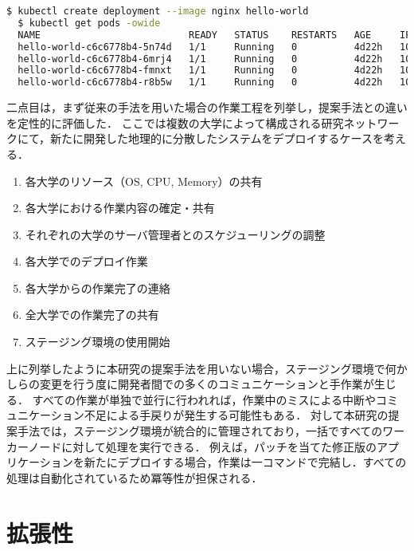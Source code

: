 \begin{lstlisting}[language=bash]
  $ kubectl create deployment --image nginx hello-world
  $ kubectl get pods -owide
  NAME                          READY   STATUS    RESTARTS   AGE     IP          NODE       NOMINATED NODE   READINESS GATES
  hello-world-c6c6778b4-5n74d   1/1     Running   0          4d22h   10.44.0.1   node01     <none>           <none>
  hello-world-c6c6778b4-6mrj4   1/1     Running   0          4d22h   10.42.0.1   node03     <none>           <none>
  hello-world-c6c6778b4-fmnxt   1/1     Running   0          4d22h   10.47.0.1   node02     <none>           <none>
  hello-world-c6c6778b4-r8b5w   1/1     Running   0          4d22h   10.44.0.2   node04   <none>           <none>
\end{lstlisting}

二点目は，まず従来の手法を用いた場合の作業工程を列挙し，提案手法との違いを定性的に評価した．
ここでは複数の大学によって構成される研究ネットワークにて，新たに開発した地理的に分散したシステムをデプロイするケースを考える．

\begin{enumerate}
  \item 各大学のリソース（OS, CPU, Memory）の共有
  \item 各大学における作業内容の確定・共有
  \item それぞれの大学のサーバ管理者とのスケジューリングの調整
  \item 各大学でのデプロイ作業
  \item 各大学からの作業完了の連絡
  \item 全大学での作業完了の共有
  \item ステージング環境の使用開始
\end{enumerate}

上に列挙したように本研究の提案手法を用いない場合，ステージング環境で何かしらの変更を行う度に開発者間での多くのコミュニケーションと手作業が生じる．
すべての作業が単独で並行に行われれば，作業中のミスによる中断やコミュニケーション不足による手戻りが発生する可能性もある．
対して本研究の提案手法では，ステージング環境が統合的に管理されており，一括ですべてのワーカーノードに対して処理を実行できる．
例えば，パッチを当てた修正版のアプリケーションを新たにデプロイする場合，作業は一コマンドで完結し．すべての処理は自動化されているため冪等性が担保される．

\section{拡張性}
\label{evaluation:method}

